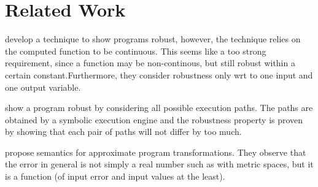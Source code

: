 \section{Related Work}

\cite{Chaudhuri2011} develop a technique to show programs robust, however, the technique relies
on the computed function to be continuous. This seems like a too strong
requirement, since a function may be non-continous, but still robust within a
certain constant.Furthermore, they consider robustness only wrt to one input and one output variable.


\cite{Majumdar2009} show a program robust by considering all possible
execution paths. The paths are obtained by a symbolic execution engine and the
robustness property is proven by showing that each pair of paths will not
differ by too much.


\cite{Westbrook2013} propose semantics for approximate program
transformations. They observe that the error in general is not simply a real
number such as with  metric spaces, but it is a function (of input error and
input values at the least).
